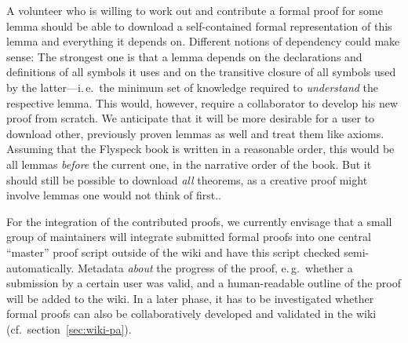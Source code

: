 A volunteer who is willing to work out and contribute a formal proof for some lemma should
be able to download a self-contained formal representation of this lemma and everything it
depends on.  Different notions of dependency could make sense: The strongest one is that a
lemma depends on the declarations and definitions of all symbols it uses and on the
transitive closure of all symbols used by the latter---i.\,e.\ the minimum set of
knowledge required to \emph{understand} the respective lemma.  This would, however,
require a collaborator to develop his new proof from scratch.  We anticipate that it will
be more desirable for a user to download other, previously proven
lemmas
as well and treat them like axioms.  Assuming that the Flyspeck book is
written in a reasonable order, this would be all lemmas \emph{before} the current one, in
the narrative order of the book.  But it should still be possible to download \emph{all}
theorems, as a creative proof might involve lemmas one would not think of
first..

For the integration of the contributed proofs, we currently envisage that a small group of
maintainers will integrate submitted formal proofs into one central ``master'' proof
script outside of the wiki and have this script checked semi-automatically.  Metadata
\emph{about} the progress of the proof, e.\,g.\ whether a submission by a certain user was
valid, and a human-readable outline of the proof will be added to the wiki.
In a later phase, it has to be investigated whether formal proofs can also be
collaboratively developed and validated in the wiki (cf.\ section~\ref{sec:wiki-pa}).


